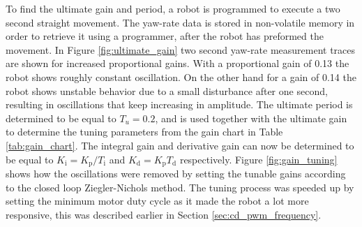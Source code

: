 To find the ultimate gain and period, a robot is programmed to execute a two second straight movement.
The yaw-rate data is stored in non-volatile memory in order to retrieve it using a programmer, after the robot has preformed the movement.
In Figure \ref{fig:ultimate_gain} two second yaw-rate measurement traces are shown for increased proportional gains.
With a proportional gain of 0.13 the robot shows roughly constant oscillation.
On the other hand for a gain of 0.14 the robot shows unstable behavior due to a small disturbance after one second, resulting in oscillations that keep increasing in amplitude.
The ultimate period is determined to be equal to $T_{u} = 0.2$, and is used together with the ultimate gain to determine the tuning parameters from the gain chart in Table \ref{tab:gain_chart}.
The integral gain and derivative gain can now be determined to be equal to $K_{\text{i}}  = K_{\text{p}} / T_{\text{i}}$ and $K_{\text{d}}  = K_{\text{p}}T_{\text{d}}$ respectively.
Figure \ref{fig:gain_tuning} shows how the oscillations were removed by setting the tunable gains according to the closed loop Ziegler-Nichols method.
The tuning process was speeded up by setting the minimum motor duty cycle as it made the robot a lot more responsive, this was described earlier in Section \ref{sec:cd_pwm_frequency}.


